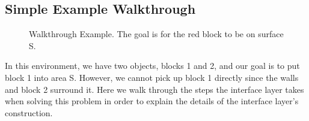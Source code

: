 \documentclass[12pt]{article}
\begin{document}
\subsection{Simple Example Walkthrough}

\begin{figure}[t]
\centering
\def\svgwidth{0.5\textwidth}

\caption{Walkthrough Example. The goal is for the red block to be on surface S.\label{fig:walkthrough}}
\end{figure}

In this environment, we have two objects, blocks 1 and 2, and our goal is to put block 1 into area S.  
However, we cannot pick up block 1 directly since the walls and block 2 surround it.  
Here we walk through the steps the interface layer takes when solving this problem in order to explain the details of the interface layer's construction.
\end{document}
